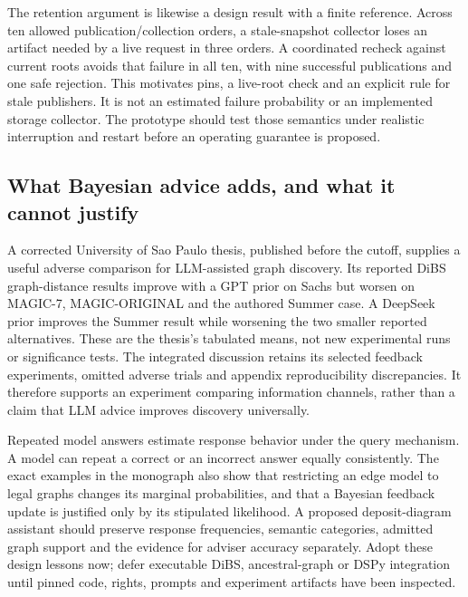 The retention argument is likewise a design result with a finite
reference. Across ten allowed publication/collection orders, a
stale-snapshot collector loses an artifact needed by a live request in
three orders. A coordinated recheck against current roots avoids that
failure in all ten, with nine successful publications and one safe
rejection. This motivates pins, a live-root check and an explicit rule
for stale publishers. It is not an estimated failure probability or an
implemented storage collector. The prototype should test those semantics
under realistic interruption and restart before an operating guarantee
is proposed. \citep{sp18_retention}

\hypertarget{what-bayesian-advice-adds-and-what-it-cannot-justify}{%
\subsection{What Bayesian advice adds, and what it cannot
justify}\label{what-bayesian-advice-adds-and-what-it-cannot-justify}}

A corrected University of Sao Paulo thesis, published before the cutoff,
supplies a useful adverse comparison for LLM-assisted graph discovery.
Its reported DiBS graph-distance results improve with a GPT prior on
Sachs but worsen on MAGIC-7, MAGIC-ORIGINAL and the authored Summer
case. A DeepSeek prior improves the Summer result while worsening the
two smaller reported alternatives. These are the thesis's tabulated
means, not new experimental runs or significance tests. The integrated
discussion retains its selected feedback experiments, omitted adverse
trials and appendix reproducibility discrepancies. It therefore supports
an experiment comparing information channels, rather than a claim that
LLM advice improves discovery universally. \citep{exec18_videira_thesis}

Repeated model answers estimate response behavior under the query
mechanism. A model can repeat a correct or an incorrect answer equally
consistently. The exact examples in the monograph also show that
restricting an edge model to legal graphs changes its marginal
probabilities, and that a Bayesian feedback update is justified only by
its stipulated likelihood. A proposed deposit-diagram assistant should
preserve response frequencies, semantic categories, admitted graph
support and the evidence for adviser accuracy separately. Adopt these
design lessons now; defer executable DiBS, ancestral-graph or DSPy
integration until pinned code, rights, prompts and experiment artifacts
have been inspected.
\citep{exec18_bayesian_reference,exec18_videira_thesis}

